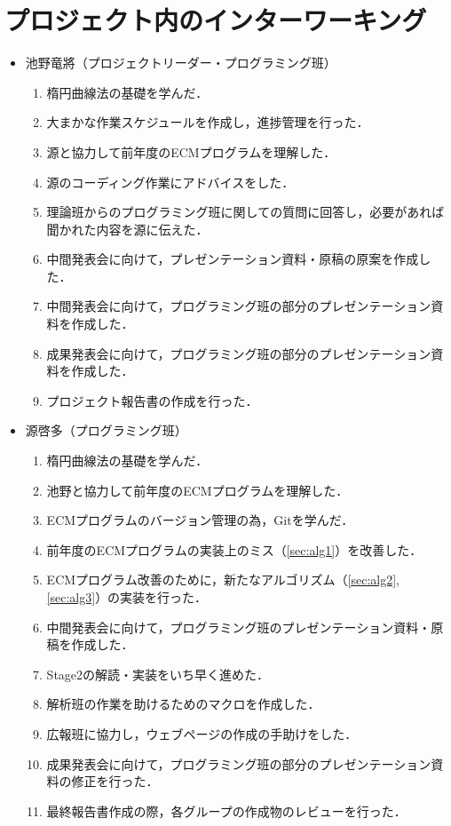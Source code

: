 \documentclass[openany,11pt,papersize]{jsbook}
\begin{document}
\chapter{プロジェクト内のインターワーキング}
\begin{itemize}
\item 池野竜將（プロジェクトリーダー・プログラミング班）
 \begin{enumerate}
 \renewcommand{\labelenumi}{(\arabic{enumi})}
 \item 楕円曲線法の基礎を学んだ．
 \item 大まかな作業スケジュールを作成し，進捗管理を行った．
 \item 源と協力して前年度のECMプログラムを理解した．
 \item 源のコーディング作業にアドバイスをした．
 \item 理論班からのプログラミング班に関しての質問に回答し，必要があれば聞かれた内容を源に伝えた．
 \item 中間発表会に向けて，プレゼンテーション資料・原稿の原案を作成した．
 \item 中間発表会に向けて，プログラミング班の部分のプレゼンテーション資料を作成した．
 \item 成果発表会に向けて，プログラミング班の部分のプレゼンテーション資料を作成した．
 \item プロジェクト報告書の作成を行った．
 \end{enumerate}
 
\item 源啓多（プログラミング班）
 \begin{enumerate}
 \renewcommand{\labelenumi}{(\arabic{enumi})}
 \item 楕円曲線法の基礎を学んだ．
 \item 池野と協力して前年度のECMプログラムを理解した．
 \item ECMプログラムのバージョン管理の為，Gitを学んだ．
 \item 前年度のECMプログラムの実装上のミス（\ref{sec:alg1}）を改善した．
 \item ECMプログラム改善のために，新たなアルゴリズム（\ref{sec:alg2}, \ref{sec:alg3}）の実装を行った．
 \item 中間発表会に向けて，プログラミング班のプレゼンテーション資料・原稿を作成した．
 \item Stage2の解読・実装をいち早く進めた．
 \item 解析班の作業を助けるためのマクロを作成した．
 \item 広報班に協力し，ウェブページの作成の手助けをした．
 \item 成果発表会に向けて，プログラミング班の部分のプレゼンテーション資料の修正を行った．
 \item 最終報告書作成の際，各グループの作成物のレビューを行った．
 \end{enumerate}
 

\end{itemize}
\end{document}
